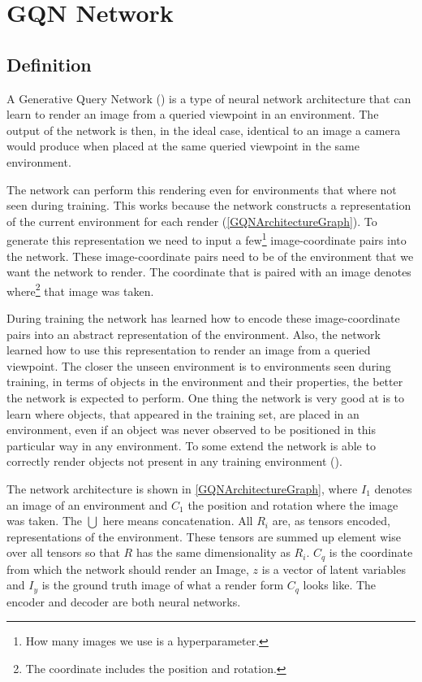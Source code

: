\section{GQN Network}\label{BackgroundGQN}
\subsection{Definition}
A Generative Query Network (\cite{gqn}) is a type of neural network architecture that can learn to render an image from a queried viewpoint in an environment. The output of the network is then, in the ideal case, identical to an image a camera would produce when placed at the same queried viewpoint in the same environment.

The network can perform this rendering even for environments that where not seen during training. This works because the network constructs a representation of the current environment for each render (\cref{GQNArchitectureGraph}). To generate this representation we need to input a few\footnote{How many images we use is a hyperparameter.} image-coordinate pairs into the network. These image-coordinate pairs need to be of the environment that we want the network to render. The coordinate that is paired with an image denotes where\footnote{The coordinate includes the position and rotation.} that image was taken.

During training the network has learned how to encode these image-coordinate pairs into an abstract representation of the environment. Also, the network learned how to use this representation to render an image from a queried viewpoint. The closer the unseen environment is to environments seen during training, in terms of objects in the environment and their properties, the better the network is expected to perform. One thing the network is very good at is to learn where objects, that appeared in the training set, are placed in an environment, even if an object was never observed to be positioned in this particular way in any environment. To some extend the network is able to correctly render objects not present in any training environment (\cite{gqn}).

The network architecture is shown in \cref{GQNArchitectureGraph}, where $I_1$ denotes an image of an environment and $C_1$ the position and rotation where the image was taken. The $\bigcup$ here means concatenation. All $R_i$ are, as tensors encoded, representations of the environment. These tensors are summed up element wise over all tensors so that $R$ has the same dimensionality as $R_i$. $C_q$ is the coordinate from which the network should render an Image, $z$ is a vector of latent variables and $I_y$ is the ground truth image of what a render form $C_q$ looks like. The encoder and decoder are both neural networks.

